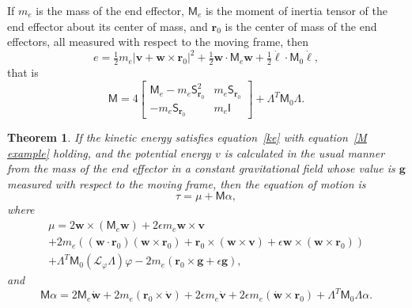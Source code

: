 \documentclass[reqno,12pt]{amsart}
\newcommand\starop[1]{\mathsf S_{#1}}
\newcommand{\liederiv}{\mathcal L}
\newtheorem{Theorem}{Theorem}
\begin{document}
If $m_e$ is the mass of the end effector, $\mathsf M_e$ is the moment of inertia tensor of the end effector about its center of mass, and $\bm r_0$ is the center of mass of the end effectors, all measured with respect to the moving frame, then
\begin{equation}
\label{ke written in full}
e = \tfrac12 m_e |\bm v + \bm w \times \bm r_0|^2 + \tfrac12 \bm w \cdot \mathsf M_e \bm w + \tfrac12 \dot{\bm\ell} \cdot \mathsf M_0 \dot{\bm\ell} , 
\end{equation}
that is
\begin{equation}
\label{M example}
\mathsf M = 4 \begin{bmatrix} \mathsf M_e - m_e \starop{\bm r_0}^2 & m_e \starop{\bm r_0} \\ - m_e \starop{\bm r_0} & m_e \mathsf I \end{bmatrix} + \mathsf\Lambda^T \mathsf M_0 \mathsf\Lambda.
\end{equation}

\begin{Theorem}
\label{equation of motion}
If the kinetic energy satisfies equation~\eqref{ke} with equation~\eqref{M example} holding, and the potential energy $v$ is calculated in the usual manner from the mass of the end effector in a constant gravitational field whose value is $\bm g$ measured with respect to the moving frame, then the equation of motion is
\begin{equation}
\tau = \mu + \mathsf M \alpha,
\end{equation}
where
\begin{multline}
\label{tau example}
\mu = 2\bm w \times (\mathsf M_e \bm w) + 2\epsilon m_e \bm w \times \bm v \\
+ 2 m_e ((\bm w \cdot \bm r_0) (\bm w \times \bm r_0) + \bm r_0 \times (\bm w \times \bm v) + \epsilon \bm w \times (\bm w \times \bm r_0)) \\
+ \mathsf \Lambda^T \mathsf M_0 (\liederiv_\varphi \mathsf \Lambda) \varphi 
- 2 m_e (\bm r_0 \times \bm g + \epsilon \bm g) ,
\end{multline}
and
\begin{equation}
\mathsf M \alpha = 2 \mathsf M_e \dot{\bm w} + 2 m_e (\bm r_0 \times \dot{\bm v}) + 2 \epsilon m_e \dot{\bm v} + 2 \epsilon m_e (\dot{\bm w} \times \bm r_0) + \mathsf\Lambda^T \mathsf M_0 \mathsf \Lambda \alpha.
\end{equation}
\end{Theorem}
\end{document}
